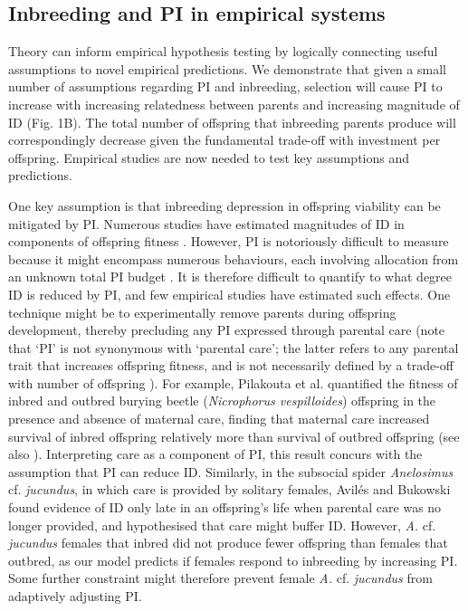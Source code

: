 \documentclass[12pt]{article}
\begin{document}
\subsection*{Inbreeding and PI in empirical systems}

Theory can inform empirical hypothesis testing by logically connecting {\color{blue}useful} assumptions to novel empirical predictions. We demonstrate that given a small number of assumptions regarding PI and inbreeding, selection will cause PI to increase with increasing relatedness between parents and increasing magnitude of ID (Fig. 1B). The total number of offspring that inbreeding parents produce will correspondingly decrease given the fundamental trade-off with investment per offspring. Empirical studies are now needed to test key assumptions and predictions.

One key assumption is that inbreeding depression in offspring viability can be mitigated by PI. Numerous studies have estimated magnitudes of ID in components of offspring fitness \cite[][]{Keller2002, Charlesworth2009, Szulkin2012}. However, PI is notoriously difficult to measure because it might encompass numerous behaviours, each involving allocation from an unknown total PI budget \cite[][]{Parker2002}. It is therefore difficult to quantify to what degree ID is reduced by PI, and few empirical studies have estimated such effects. {\color{blue}One technique might be to experimentally remove parents during offspring development, thereby precluding any PI expressed through parental care (note that `PI' is not synonymous with `parental care'; the latter refers to any parental trait that increases offspring fitness, and is not necessarily defined by a trade-off with number of offspring \cite{Gardner2011a, Royle2012}). For example,} Pilakouta et al. \cite{Pilakouta2015} quantified the fitness of inbred and outbred burying beetle (\textit{Nicrophorus vespilloides}) offspring in the presence and absence of maternal care, finding that maternal care increased survival of inbred offspring relatively more than survival of outbred offspring {\color{blue}(see also \cite{Pilakouta2016})}. Interpreting care as a component of PI, this result concurs with the assumption that PI can reduce ID. Similarly, in the subsocial spider \textit{Anelosimus} cf. \textit{jucundus}, in which care is provided by solitary females, Avil{\'{e}}s and Bukowski \cite{Aviles2006} found evidence of ID only late in an offspring's life when parental care was no longer provided, and hypothesised that care might buffer ID. However, \textit{A.} cf. \textit{jucundus} females that inbred did not produce fewer offspring than females that outbred, as our model predicts if females respond to inbreeding by increasing PI. Some further constraint might therefore prevent female \textit{A.} cf. \textit{jucundus} from adaptively adjusting PI.
\end{document}
